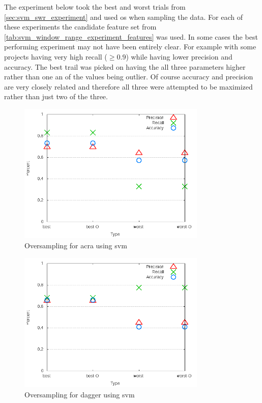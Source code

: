 The experiment below took the best and worst trials from \autoref{sec:svm_swr_experiment} and used \gls{os} when sampling the data. For each of these experiments the candidate feature set from \autoref{tab:svm_window_range_experiment_features} was used. In some cases the best performing experiment may not have been entirely clear. For example with some projects having very high recall ($ \geq 0.9$) while having lower precision and accuracy. The best trail was picked on having the all three parameters higher rather than one an of the values being outlier. Of course accuracy and precision are very closely related and therefore all three were attempted to be maximized rather than just two of the three.

\begin{figure}[!t]
    \centering

        \includegraphics[width=0.8\textwidth]{images/svm/test_4/acra_sample_range}
        \caption{Oversampling for acra using \gls{svm}}
        \label{fig:test_4_acra_svm}
\end{figure}

\begin{figure}[!ht]
    \centering
        \includegraphics[width=0.8\textwidth]{images/svm/test_4/dagger_sample_range}
        \caption{Oversampling for dagger using \gls{svm}}
        \label{fig:test_4_dagger_svm}
\end{figure}

